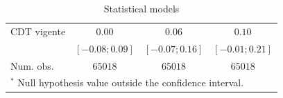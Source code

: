 \begin{table}
\begin{center}
\begin{tabular}{l c c c}
CDT vigente                 & $0.00$              & $0.06$              & $0.10$             \\
                            & $ [ -0.08;   0.09]$ & $ [ -0.07;   0.16]$ & $ [ -0.01;  0.21]$ \\
\hline
Num. obs.                   & $65018$             & $65018$             & $65018$            \\
\hline
\multicolumn{4}{l}{\scriptsize{$^*$ Null hypothesis value outside the confidence interval.}}
\end{tabular}
\caption{Statistical models}
\label{table:coefficients}
\end{center}
\end{table}
